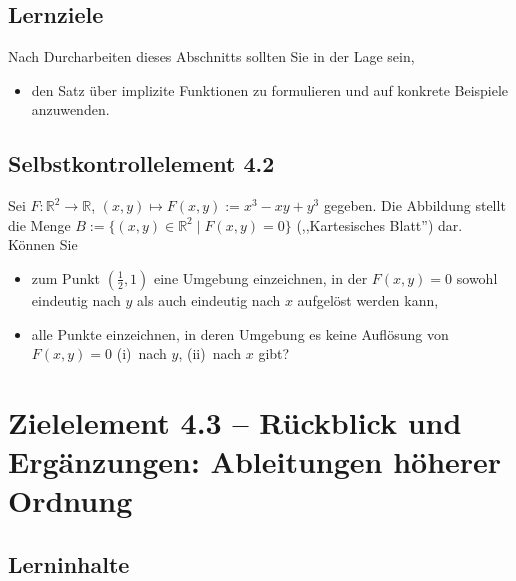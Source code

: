 \documentclass[a4paper,12pt]{article}
\begin{document}
\subsection*{Lernziele}

Nach Durcharbeiten dieses Abschnitts sollten Sie in der Lage sein,
\begin{itemize}
  \item den Satz über implizite Funktionen zu formulieren und auf konkrete Beispiele anzuwenden.
\end{itemize}

\subsection*{Selbstkontrollelement 4.2}

Sei $F: \mathbb{R}^2 \to \mathbb{R}$, $(x, y) \mapsto F(x, y) := x^3 - xy + y^3$ gegeben.
Die Abbildung stellt die Menge $B := \{(x, y) \in \mathbb{R}^2 \mid F(x, y) = 0\}$
(,,Kartesisches Blatt'') dar. Können Sie
\begin{itemize}
  \item zum Punkt $(\tfrac{1}{2}, 1)$ eine Umgebung einzeichnen, in der $F(x, y) = 0$ sowohl
        eindeutig nach $y$ als auch eindeutig nach $x$ aufgelöst werden kann,
  \item alle Punkte einzeichnen, in deren Umgebung es keine Auflösung von $F(x, y) = 0$
        (i)~nach $y$, (ii)~nach $x$ gibt?
\end{itemize}

\newpage

\section*{Zielelement 4.3 -- Rückblick und Ergänzungen: Ableitungen höherer Ordnung}

\subsection*{Lerninhalte}
\end{document}
